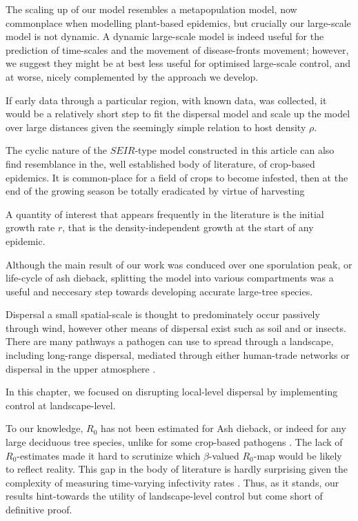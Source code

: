 The scaling up of our model resembles a metapopulation model, now commonplace when modelling plant-based epidemics, but crucially our large-scale model is not dynamic. A dynamic large-scale model is indeed useful for the prediction of time-scales and the movement of disease-fronts movement; however, we suggest they might be at best less useful for optimised large-scale control, and at worse, nicely complemented by the approach we develop.

If early data through a particular region, with known data, was collected, it would be a relatively short step to fit the dispersal model and scale up the model over large distances given the seemingly simple relation to host density $\rho$.

The cyclic nature of the $SEIR$-type model constructed in this article can also find resemblance in the, well established body of literature, of crop-based epidemics. It is common-place for a field of crops to become infested, then at the end of the growing season be totally eradicated by virtue of harvesting %

A quantity of interest that appears frequently in the literature is the initial growth rate $r$, that is the density-independent growth at the start of any epidemic.

Although the main result of our work was conduced over one sporulation peak, or life-cycle of ash dieback, splitting the model into various compartments was a useful and neccesary step towards developing accurate large-tree species.%

Dispersal a small spatial-scale is thought to predominately occur passively through wind, however other means of dispersal exist such as soil and or insects. There are many pathways a pathogen can use to spread through a landscape, including long-range dispersal, mediated through either human-trade networks %
\cite{hulme2009trade, banks2015role, chapman2017global} or dispersal in the upper atmosphere \cite{westbrook1999atmospheric, isard2005principles}.  

In this chapter, we focused on disrupting local-level dispersal by implementing control at landscape-level.

To our knowledge, $R_0$ has not been estimated for Ash dieback, or indeed for any large deciduous tree species, unlike for some crop-based pathogens \cite{segarra2001epidemic}. The lack of $R_0$-estimates made it hard to scrutinize which $\beta$-valued $R_0$-map would be likely to reflect reality. This gap in the body of literature is hardly surprising given the complexity of measuring time-varying infectivity rates \cite{13-challenges}. Thus, as it stands, our results hint-towards the utility of landscape-level control but come short of definitive proof.

